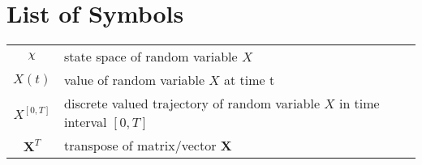 \chapter*{List of Symbols}

\begin{tabular}{cp{}}
	$ \rchi $ & state space of random variable $ X $ \\
	$ X(t) $ & value of random variable $X$ at time t \\
	$ X^{[0, T]} $ & discrete valued trajectory of random variable $ X $ in time interval $ [0, T] $ \\
	$ \textbf{X}^T $ & transpose of matrix/vector \textbf{X}
\end{tabular}\\
